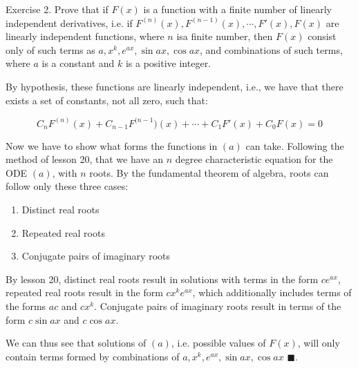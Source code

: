 \documentclass{article}
\begin{document}
Exercise 2. Prove that if $F(x)$ is a function with a finite number of linearly independent derivatives, i.e. if $F^{(n)}(x),F^{(n-1)}(x),\cdots,F'(x),F(x)$ are linearly independent functions, where $n$ isa finite number, then $F(x)$ consist only of such terms as $a, x^k, e^{ax}, \sin{ax}, \cos{ax}$, and combinations of such terms, where $a$ is a constant and $k$ is a positive integer.

By hypothesis, these functions are linearly independent, i.e., we have that there exists a set of constants, not all zero, such that:

\[ \tag{a} C_nF^{(n)}(x) + C_{n-1}F^{(n-1})(x) + \cdots + C_1 F'(x) + C_0 F(x) = 0 \]

Now we have to show what forms the functions in $(a)$ can take. Following the method of lesson 20, that we have an $n$ degree characteristic equation for the ODE $(a)$, with $n$ roots. By the fundamental theorem of algebra, roots can follow only these three cases:

\begin{enumerate}
\item Distinct real roots
\item Repeated real roots
\item Conjugate pairs of imaginary roots
\end{enumerate}

By lesson 20, distinct real roots result in solutions with terms in the form $ce^{ax}$, repeated real roots result in the form $cx^ke^{ax}$, which additionally includes terms of the forms $ac$ and $cx^k$. Conjugate pairs of imaginary roots result in terms of the form $c\sin{ax}$ and $c\cos{ax}$.

We can thus see that solutions of $(a)$, i.e. possible values of $F(x)$, will only contain terms formed by combinations of $a, x^k, e^{ax}, \sin{ax}, \cos{ax}$ $\blacksquare$.
\end{document}
